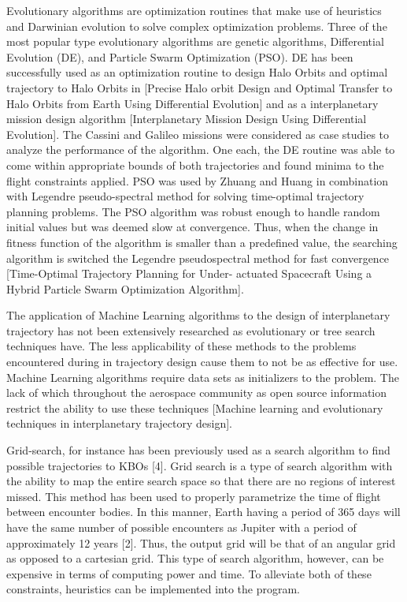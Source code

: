 \documentclass[letterpaper, preprint, paper,11pt]{AAS}	%
\begin{document}
Evolutionary algorithms are optimization routines that make use of heuristics and Darwinian evolution to solve complex optimization problems. Three of the most popular type evolutionary algorithms are genetic algorithms, Differential Evolution (DE), and Particle Swarm Optimization (PSO). DE has been successfully used as an optimization routine to design Halo Orbits and optimal trajectory to Halo Orbits in [Precise Halo orbit Design and Optimal Transfer to Halo Orbits from Earth Using Differential Evolution] and as a interplanetary mission design algorithm [Interplanetary Mission Design Using Differential Evolution].  The Cassini and Galileo missions were considered as case studies to analyze the performance of the algorithm. One each, the DE routine was able to come within appropriate bounds of both trajectories and found minima to the flight constraints applied. PSO was used by Zhuang and Huang in combination with Legendre pseudo-spectral method for solving time-optimal trajectory planning problems. The PSO algorithm was robust enough to handle random initial values but was deemed slow at convergence. Thus, when the change in fitness function of the algorithm is smaller than a predefined value, the searching algorithm is switched the Legendre pseudospectral method for fast convergence [Time-Optimal Trajectory Planning for Under- actuated Spacecraft Using a Hybrid Particle Swarm Optimization Algorithm].  

The application of Machine Learning algorithms to the design of interplanetary trajectory has not been extensively researched as evolutionary or tree search techniques have. The less applicability of these methods to the problems encountered during in trajectory design cause them to not be as effective for use. Machine Learning algorithms require data sets as initializers to the problem. The lack of which throughout the aerospace community as open source information restrict the ability to use these techniques [Machine learning and evolutionary techniques in interplanetary trajectory design]. 

Grid-search, for instance has been previously used as a search algorithm to find possible trajectories to KBOs [4]. Grid search is a type of search algorithm with the ability to map the entire search space so that there are no regions of interest missed. This method has been used to properly parametrize the time of flight between encounter bodies. In this manner, Earth having a period of 365 days will have the same number of possible encounters as Jupiter with a period of approximately 12 years [2]. Thus, the output grid will be that of an angular grid as opposed to a cartesian grid. This type of search algorithm, however, can be expensive in terms of computing power and time. To alleviate both of these constraints, heuristics can be implemented into the program.  
\end{document}
